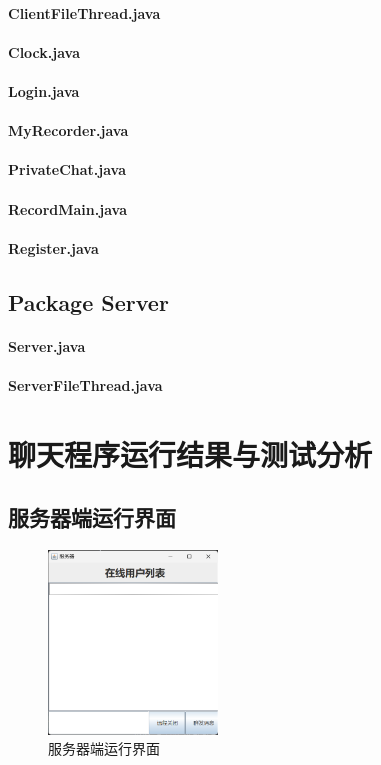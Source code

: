 \documentclass[UTF8,12pt]{article}
\begin{document}
\paragraph{ClientFileThread.java}
\paragraph{Clock.java}
\paragraph{Login.java}
\paragraph{MyRecorder.java}
\paragraph{PrivateChat.java}
\paragraph{RecordMain.java}
\paragraph{Register.java}

\subsection{Package Server}
\paragraph{Server.java}
\paragraph{ServerFileThread.java}

\newpage

\section{聊天程序运行结果与测试分析}
\subsection{服务器端运行界面}
\begin{figure}[htbp]
    \centering
    \includegraphics[width=0.4\textwidth]{img/6.png}
    \caption{服务器端运行界面}
\end{figure}
\end{document}
